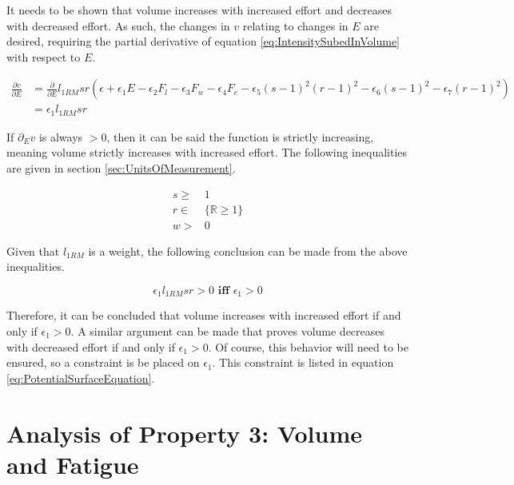 It needs to be shown that volume increases with increased effort and decreases with decreased effort. As such, the changes in $v$ relating to changes in $E$ are desired, requiring the partial derivative of equation \ref{eq:IntensitySubedInVolume} with respect to $E$.

\begin{equation*}
    \begin{split}
    		\frac{\partial v}{\partial E} & =
    		\frac{\partial}{\partial E} l_{1RM}sr\left( 
    			\epsilon+
    			\epsilon_1 E-
    			\epsilon_2 F_l-
    			\epsilon_3 F_w-
    			\epsilon_4 F_e-
    			\epsilon_5(s-1)^2(r-1)^2-
    			\epsilon_6(s-1)^2-
    			\epsilon_7(r-1)^2
    		\right) \\
    		& =\epsilon_1 l_{1RM} sr
    \end{split}
\end{equation*}

If $\partial_{E}v$ is always $>0$, then it can be said the function is strictly increasing, meaning volume strictly increases with increased effort. The following inequalities are given in section \ref{sec:UnitsOfMeasurement}.

\begin{equation*}
    \begin{split}
        s \ge & 1 \\
        r \in & \{ \mathbb{R}\ge 1 \} \\
        w > & 0
    \end{split}
\end{equation*}

Given that $l_{1RM}$ is a weight, the following conclusion can be made from the above inequalities.

\begin{equation*}
    \epsilon_1 l_{1RM} sr> 0 \textbf{ iff } \epsilon_1> 0
\end{equation*}

Therefore, it can be concluded that volume increases with increased effort if and only if $\epsilon_1> 0$. A similar argument can be made that proves volume decreases with decreased effort if and only if $\epsilon_1> 0$. Of course, this behavior will need to be ensured, so a constraint is be placed on $\epsilon_1$. This constraint is listed in equation \ref{eq:PotentialSurfaceEquation}.

\section{Analysis of Property 3: Volume and Fatigue}
\label{sec:PotentialSurfaceAnalysisOfProperty3}

